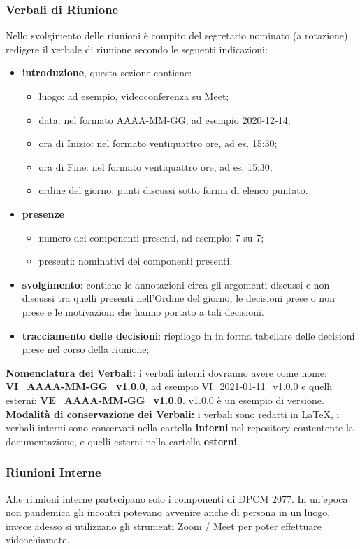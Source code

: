 \subsubsection{Verbali di Riunione}
Nello svolgimento delle riunioni è compito del segretario nominato (a rotazione) redigere il verbale di riunione secondo le seguenti indicazioni:
\begin{itemize}
\item{\textbf{introduzione}, questa sezione contiene:}
	\begin{itemize}
	\item{luogo: ad esempio, videoconferenza su Meet;}
	\item{data: nel formato AAAA-MM-GG, ad esempio 2020-12-14;}
	\item{ora di Inizio:  nel formato ventiquattro ore, ad es. 15:30;}
	\item{ora di Fine:  nel formato ventiquattro ore, ad es. 15:30;}
	\item{ordine del giorno: punti discussi sotto forma di elenco puntato.}
	\end{itemize}
\item{\textbf{presenze}}
	\begin{itemize}
	\item{numero dei componenti presenti, ad esempio: 7 su 7;}
	\item{presenti: nominativi dei componenti presenti;}
	\end{itemize}
\item{\textbf{svolgimento}: contiene le annotazioni circa gli argomenti discussi e non discussi tra quelli presenti nell’Ordine del giorno, le decisioni prese o non prese e le motivazioni che hanno portato a tali decisioni.}
\item{\textbf{tracciamento delle decisioni}: riepilogo in in forma tabellare delle decisioni prese nel corso della riunione;}
\end{itemize}
\textbf{Nomenclatura dei Verbali: } i verbali interni dovranno avere come nome: \textbf{VI\_AAAA-MM-GG\_v1.0.0}, ad esempio VI\_2021-01-11\_v1.0.0 e quelli esterni: \textbf{VE\_AAAA-MM-GG\_v1.0.0}. v1.0.0 è un esempio di versione.\\
\textbf{Modalità di conservazione dei Verbali:} i verbali sono redatti in \LaTeX, i verbali interni sono conservati nella cartella \textbf{interni} nel repository  contentente la documentazione, e quelli esterni nella cartella \textbf{esterni}.

\subsubsection{Riunioni Interne}
Alle riunioni interne partecipano solo i componenti di DPCM 2077.
In un'epoca non pandemica gli incontri potevano avvenire anche di persona in un luogo, invece adesso si utilizzano gli strumenti Zoom / Meet per poter effettuare videochiamate.

